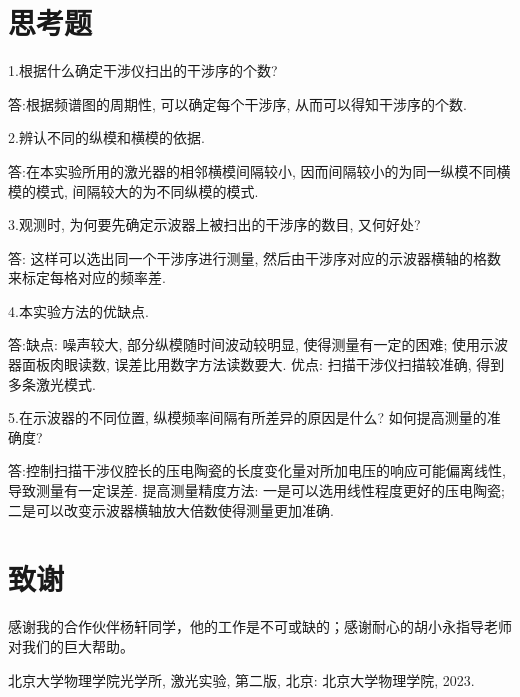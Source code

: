 \documentclass[aps,pre,12pt,preprint,%
	onecolumn,showpacs,showkeys,nofootinbib]{revtex4-2}
\begin{document}
\section{思考题}
1.根据什么确定干涉仪扫出的干涉序的个数?
\par 答:根据频谱图的周期性, 可以确定每个干涉序, 从而可以得知干涉序的个数.

2.辨认不同的纵模和横模的依据.
\par 答:在本实验所用的激光器的相邻横模间隔较小, 因而间隔较小的为同一纵模不同横模的模式, 间隔较大的为不同纵模的模式.

3.观测时, 为何要先确定示波器上被扫出的干涉序的数目, 又何好处?
\par 答: 这样可以选出同一个干涉序进行测量, 然后由干涉序对应的示波器横轴的格数来标定每格对应的频率差.

4.本实验方法的优缺点.
\par 答:缺点: 噪声较大, 部分纵模随时间波动较明显, 使得测量有一定的困难; 使用示波器面板肉眼读数, 误差比用数字方法读数要大. 
优点: 扫描干涉仪扫描较准确, 得到多条激光模式.

5.在示波器的不同位置, 纵模频率间隔有所差异的原因是什么? 如何提高测量的准确度?
\par 答:控制扫描干涉仪腔长的压电陶瓷的长度变化量对所加电压的响应可能偏离线性, 导致测量有一定误差. 
提高测量精度方法: 一是可以选用线性程度更好的压电陶瓷; 二是可以改变示波器横轴放大倍数使得测量更加准确.

\section{致谢}
	感谢我的合作伙伴杨轩同学，他的工作是不可或缺的；感谢耐心的胡小永指导老师对我们的巨大帮助。
\begin{thebibliography}{99}
	北京大学物理学院光学所, 激光实验, 第二版, 北京: 北京大学物理学院, 2023.
\end{thebibliography}
\clearpage
\end{document}
